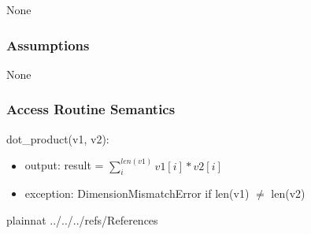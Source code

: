 \documentclass[12pt, titlepage]{article}
\begin{document}
None

\subsubsection{Assumptions}

None

\subsubsection{Access Routine Semantics}

\noindent dot\_product(v1, v2):
\begin{itemize}
\item output: result = $\sum_i^{len(v1)} v1[i] * v2[i]$
\item exception: DimensionMismatchError if len(v1) $\neq$ len(v2)
\end{itemize}


\newpage

 {plainnat}
 {../../../refs/References}

\newpage

\newpage{}
\end{document}
